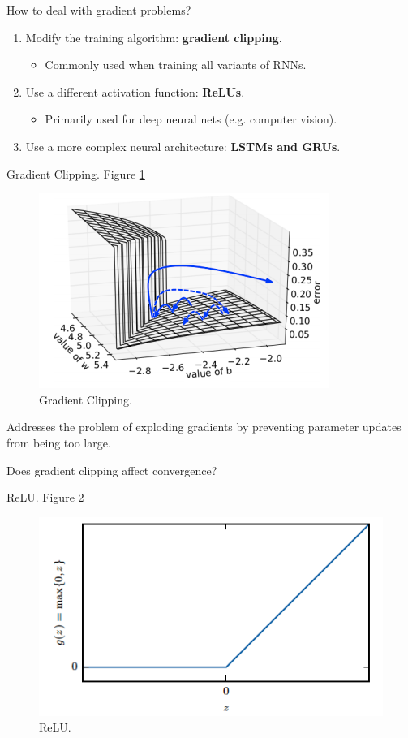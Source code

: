 \documentclass[english]{article}
\begin{document}
\item 
 {How to deal with gradient problems?}

\begin{enumerate}
\item Modify the training algorithm: \textbf{gradient clipping}.
\begin{itemize}
\item Commonly used when training all variants of RNNs.
\end{itemize}
\item Use a different activation function: \textbf{ReLUs}.
\begin{itemize}
\item Primarily used for deep neural nets (e.g. computer vision).
\end{itemize}
\item Use a more complex neural architecture: \textbf{LSTMs and GRUs}.
\end{enumerate}
 

\item 
 {Gradient Clipping}. Figure \ref{Gradient Clipping}

\begin{figure}
\centering
\includegraphics[height=0.35\linewidth]{gradient-clip2.png}
    \caption{Gradient Clipping.}
    \label{Gradient Clipping}
\end{figure}

Addresses the problem of exploding gradients by preventing parameter updates from being too large.\\
\begin{algorithmic}
\EndIf
\end{algorithmic}
Does gradient clipping affect convergence?
 

\item 
 {ReLU}.  Figure \ref{ReLU}
\begin{figure}
\centering
\includegraphics[height=0.3\linewidth]{relu.png}
    \caption{ReLU.}
    \label{ReLU}
\end{figure}
\end{document}
